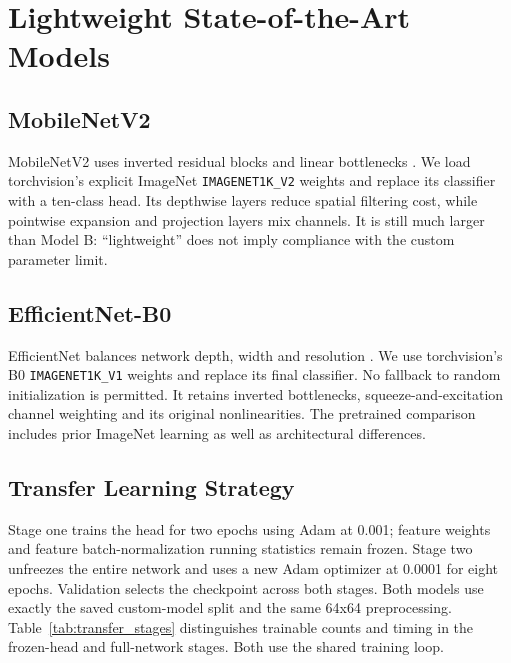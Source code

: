 \section{Lightweight State-of-the-Art Models}
\subsection{MobileNetV2}
MobileNetV2 uses inverted residual blocks and linear bottlenecks
\cite{sandler2018}. We load torchvision's explicit ImageNet
\texttt{IMAGENET1K\_V2} weights and replace its classifier with a ten-class head.
Its depthwise layers reduce spatial filtering cost, while pointwise expansion
and projection layers mix channels. It is still much larger than Model B:
``lightweight'' does not imply compliance with the custom parameter limit.
\subsection{EfficientNet-B0}
EfficientNet balances network depth, width and resolution \cite{tan2019}.
We use torchvision's B0 \texttt{IMAGENET1K\_V1} weights and replace its final
classifier. No fallback to random initialization is permitted.
It retains inverted bottlenecks, squeeze-and-excitation channel weighting
and its original nonlinearities. The pretrained comparison includes prior
ImageNet learning as well as architectural differences.
\subsection{Transfer Learning Strategy}
Stage one trains the head for two epochs using Adam at 0.001; feature weights
and feature batch-normalization running statistics remain frozen. Stage two
unfreezes the entire network and uses a new Adam optimizer at 0.0001 for eight
epochs. Validation selects the checkpoint across both stages. Both models use
exactly the saved custom-model split and the same 64x64 preprocessing.
Table~\ref{tab:transfer_stages} distinguishes trainable counts and timing in
the frozen-head and full-network stages. Both use the shared training loop.

